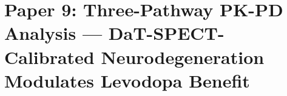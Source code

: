 
\chapter{Paper 9: Three-Pathway PK-PD Analysis --- DaT-SPECT-Calibrated Neurodegeneration Modulates Levodopa Benefit}
\label{ch:paper9}


